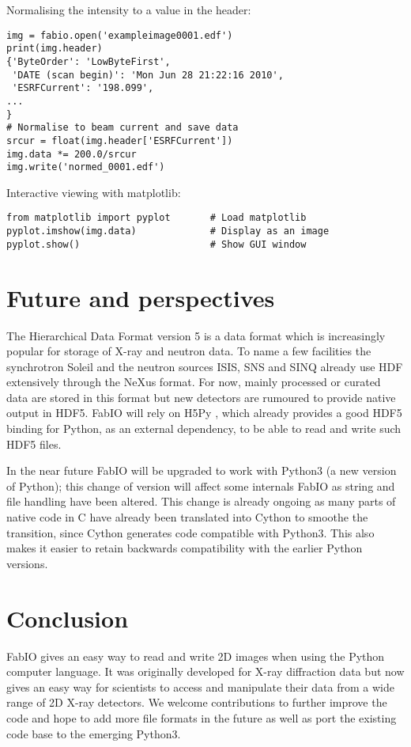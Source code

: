 \documentclass[preprint]{iucr}
\begin{document}
Normalising the intensity to a value in the header:\\
\begin{verbatim}
img = fabio.open('exampleimage0001.edf')
print(img.header)
{'ByteOrder': 'LowByteFirst',
 'DATE (scan begin)': 'Mon Jun 28 21:22:16 2010',
 'ESRFCurrent': '198.099',
...
}
# Normalise to beam current and save data
srcur = float(img.header['ESRFCurrent'])
img.data *= 200.0/srcur
img.write('normed_0001.edf')
\end{verbatim}

Interactive viewing with matplotlib:\\
\begin{verbatim}
from matplotlib import pyplot       # Load matplotlib 
pyplot.imshow(img.data)             # Display as an image
pyplot.show()                       # Show GUI window
\end{verbatim}


\section{Future and perspectives}

The Hierarchical Data Format version 5 \cite{hdf5} is a data format which is
increasingly popular for storage of X-ray and neutron data. To name a few
facilities the synchrotron Soleil \cite{tub05} and the neutron sources
ISIS, SNS and SINQ already use HDF extensively through the NeXus \cite{nexus}
format.
For now, mainly processed or curated data are stored in this format but new detectors are
rumoured to provide native output in HDF5.
FabIO will rely on H5Py \cite{h5py}, which already
provides a good HDF5 binding for Python, as an external dependency, to be able
to read and write such HDF5 files.

In the near future FabIO will be upgraded to work with Python3 (a new version of 
Python); this change of version will affect some internals FabIO as string and 
file handling have been altered.
This change is already ongoing as many parts of native code in C have already
been translated into Cython \cite{cython} to smoothe the transition, since 
Cython generates code compatible with Python3. 
This also makes it easier to retain backwards compatibility with the earlier
Python versions. 

\section{Conclusion}

FabIO gives an easy way to read and write 2D images when using the
Python computer language.
It was originally developed for X-ray diffraction data but now gives
an easy way for scientists to access and manipulate
their data from a wide range of 2D X-ray detectors.
We welcome contributions to further improve the code and hope to add
more file formats in the future as well as port the existing code base 
to the emerging Python3.
\end{document}
